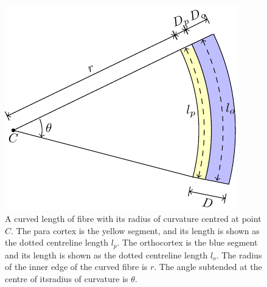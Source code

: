 %

\begin{figure}[!h]
  \centering
  \includegraphics[width=0.9\textwidth]{rmin.pdf}
  \caption{A curved length of fibre with its radius of curvature centred at point $C$. The para cortex is the yellow segment, and its length is shown as the dotted centreline length $l_{p}$. The orthocortex is the blue segment and its length is shown as the dotted centreline length $l_{o}$. The radius of the inner edge of the curved fibre is $r$. The angle subtended at the centre of itsradius of curvature is $\theta$.}
  \label{fig:rmin}
\end{figure}

%

